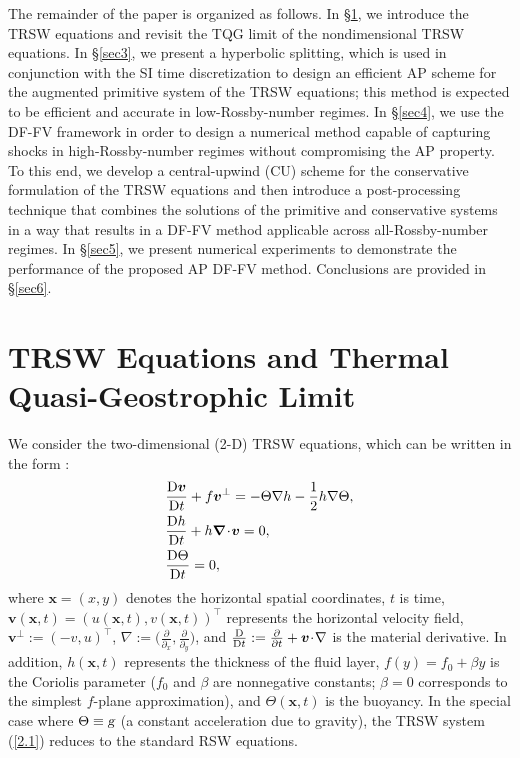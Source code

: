 \documentclass[a4paper,11pt,twoside]{article}
\numberwithin{equation}{section}
\numberwithin{figure}{section}
\numberwithin{table}{section}
\newcommand{\hf}{\frac{1}{2}}
\newcommand{\bnabla}{\bm{\nabla}}
\newcommand{\bx}{\bm{x}}
\newcommand{\bv}{\bm{v}}
\newcommand{\g}{\textsl{g}}
\newcommand\eref[1]{(\ref{#1})}
\begin{document}
The remainder of the paper is organized as follows. In \S\ref{sec2}, we introduce the TRSW equations and revisit the TQG limit of the 
nondimensional TRSW equations. In \S\ref{sec3}, we present a hyperbolic splitting, which is used in conjunction with the SI time
discretization to design an efficient AP scheme for the augmented primitive system of the TRSW equations; this method is expected to be 
efficient and accurate in low-Rossby-number regimes. In \S\ref{sec4}, we use the DF-FV framework in order to design a numerical method
capable of capturing shocks in high-Rossby-number regimes without compromising the AP property. To this end, we develop a central-upwind 
(CU) scheme for the conservative formulation of the TRSW equations and then introduce a post-processing technique that combines the
solutions of the primitive and conservative systems in a way that results in a DF-FV method applicable across all-Rossby-number regimes. In 
\S\ref{sec5}, we present numerical experiments to demonstrate the performance of the proposed AP DF-FV method. Conclusions are provided in 
\S\ref{sec6}. 

\section{TRSW Equations and Thermal Quasi-Geostrophic Limit}\label{sec2}
We consider the two-dimensional (2-D) TRSW equations, which can be written in the form \cite{Warneford_2013,Gouzien_2017}:
\begin{equation}
\begin{aligned}
&\frac{{\rm D}\bv}{{\rm D}t}+f\bv^\perp=-\Theta\nabla h-\hf h\nabla\Theta,\\
&\frac{{\rm D}h}{{\rm D}t}+h\bnabla\!\cdot\!\bv=0,\\
&\frac{{\rm D}\Theta}{{\rm D}t}=0,
\end{aligned}
\label{2.1}
\end{equation}
where $\bx=(x,y)$ denotes the horizontal spatial coordinates, $t$ is time, $\bv(\bx,t)=(u(\bx,t),v(\bx,t))^\top$ represents the horizontal
velocity field, $\bv^\perp:=(-v,u)^\top$, $\nabla:=\big(\frac{\partial}{\partial_x},\frac{\partial}{\partial_y}\big)$, and 
$\frac{{\rm D}}{{\rm D}t}:=\frac{\partial}{\partial t}+\bv\!\cdot\!\nabla$ is the material derivative. In addition, $h(\bx,t)$ represents
the thickness of the fluid layer, $f(y)=f_0+\beta y$ is the Coriolis parameter ($f_0$ and $\beta$ are nonnegative constants; $\beta=0$
corresponds to the simplest $f$-plane approximation), and $\Theta(\bx,t)$ is the buoyancy. In the special case where $\Theta\equiv\g$ (a
constant acceleration due to gravity), the TRSW system \eref{2.1} reduces to the standard RSW equations.
\end{document}
